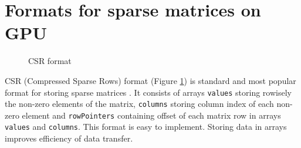 \documentclass{pj}
\begin{document}
\section{Formats for sparse matrices on GPU}
\label{sect:spmv-on-gpu}

\begin{figure}[]
\caption{CSR format}
\label{fig:csr}
\end{figure}

CSR (Compressed Sparse Rows) format (Figure \ref{fig:csr}) is standard and most popular format for storing sparse matrices \cite{Saad-2003}. It consists of arrays {\tt values} storing rowisely the non-zero elements of the matrix, {\tt columns} storing column index of each non-zero element and {\tt rowPointers} containing offset of each matrix row in arrays {\tt values} and {\tt columns}. This format is easy to implement. Storing data in arrays improves efficiency of data transfer.
\end{document}
